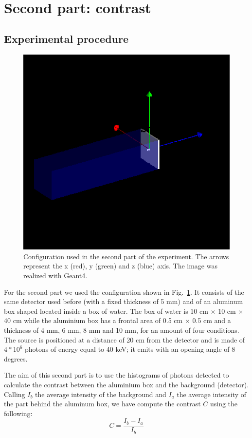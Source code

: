 \documentclass[a4paper]{article}
\begin{document}
\section{Second part: contrast}
\subsection{Experimental procedure}
\begin{figure}[H]
  \centering
  \includegraphics[width=0.6\columnwidth]{detector2.png}
  \caption{Configuration used in the second part of the experiment. The arrows represent the x (red), y (green) and z (blue) axis. The image was realized with Geant4.}
  \label{fig:conf2}
\end{figure}
For the second part we used the configuration shown in Fig.~\ref{fig:conf2}. It consists of the same detector used before (with a fixed thickness of 5 mm) and of an aluminum box shaped located inside a box of water. The box of water is 10 cm $\times$ 10 cm $\times$ 40 cm while the aluminium box has a frontal area of 0.5 cm $\times$ 0.5 cm and a thickness of 4 mm, 6 mm, 8 mm and 10 mm, for an amount of four conditions. The source is positioned at a distance of 20 cm from the detector and is made of $4*10^{6}$ photons of energy equal to 40 keV; it emits with an opening angle of 8 degrees.

The aim of this second part is to use the histograms of photons detected to calculate the contrast between the aluminium box and the background (detector). Calling $I_{b}$ the average intensity of the background and $I_{a}$ the average intensity of the part behind the aluminum box, we have compute the contrast $C$ using the following:
\begin{equation}
  C=\frac{I_{b}-I_{a}}{I_{b}}
  \label{eq:contrast}
\end{equation}
\end{document}
